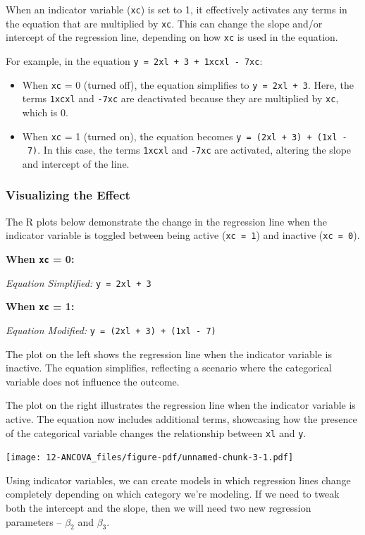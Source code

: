 \documentclass[
  letterpaper,
  DIV=11,
  numbers=noendperiod]{scrreprt}
\begin{document}
When an indicator variable (\texttt{xc}) is set to 1, it effectively
activates any terms in the equation that are multiplied by \texttt{xc}.
This can change the slope and/or intercept of the regression line,
depending on how \texttt{xc} is used in the equation.

For example, in the equation \texttt{y\ =\ 2xl\ +\ 3\ +\ 1xcxl\ -\ 7xc}:

\begin{itemize}
\item
  When \texttt{xc} = 0 (turned off), the equation simplifies to
  \texttt{y\ =\ 2xl\ +\ 3}. Here, the terms \texttt{1xcxl} and
  \texttt{-7xc} are deactivated because they are multiplied by
  \texttt{xc}, which is 0.
\item
  When \texttt{xc} = 1 (turned on), the equation becomes
  \texttt{y\ =\ (2xl\ +\ 3)\ +\ (1xl\ -\ 7)}. In this case, the terms
  \texttt{1xcxl} and \texttt{-7xc} are activated, altering the slope and
  intercept of the line.
\end{itemize}

\subsubsection{Visualizing the Effect}\label{visualizing-the-effect}

The R plots below demonstrate the change in the regression line when the
indicator variable is toggled between being active (\texttt{xc\ =\ 1})
and inactive (\texttt{xc\ =\ 0}).

\textbf{When \texttt{xc} = 0:}

\emph{Equation Simplified:} \texttt{y\ =\ 2xl\ +\ 3}

\textbf{When \texttt{xc} = 1:}

\emph{Equation Modified:} \texttt{y\ =\ (2xl\ +\ 3)\ +\ (1xl\ -\ 7)}

The plot on the left shows the regression line when the indicator
variable is inactive. The equation simplifies, reflecting a scenario
where the categorical variable does not influence the outcome.

The plot on the right illustrates the regression line when the indicator
variable is active. The equation now includes additional terms,
showcasing how the presence of the categorical variable changes the
relationship between \texttt{xl} and \texttt{y}.

\texttt{[image: 12-ANCOVA\_files/figure-pdf/unnamed-chunk-3-1.pdf]}

Using indicator variables, we can create models in which regression
lines change completely depending on which category we're modeling. If
we need to tweak both the intercept and the slope, then we will need two
new regression parameters -- \(\beta_2\) and \(\beta_3\).
\end{document}
